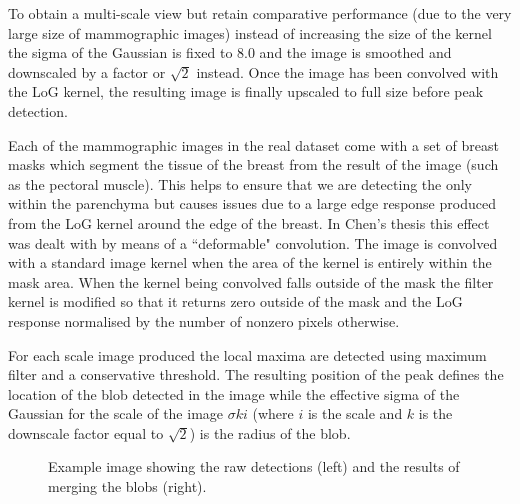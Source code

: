 To obtain a multi-scale view but retain comparative performance (due to the very large size of mammographic images) instead of increasing the size of the kernel the sigma of the Gaussian is fixed to 8.0 and the image is smoothed and downscaled by a factor or $\sqrt{2}$ instead. Once the image has been convolved with the LoG kernel, the resulting image is finally upscaled to full size before peak detection.

Each of the mammographic images in the real dataset come with a set of breast masks which segment the tissue of the breast from the result of the image (such as the pectoral muscle). This helps to ensure that we are detecting the only within the parenchyma but causes issues due to a large edge response produced from the LoG kernel around the edge of the breast. In Chen's thesis this effect was dealt with by means of a ``deformable" convolution. The image is convolved with a standard image kernel when the area of the kernel is entirely within the mask area. When the kernel being convolved falls outside of the mask the filter kernel is modified so that it returns zero outside of the mask and the LoG response normalised by the number of nonzero pixels otherwise.

For each scale image produced the local maxima are detected using maximum filter and a conservative threshold. The resulting position of the peak defines the location of the blob detected in the image while the effective sigma of the Gaussian for the scale of the image $\sigma k i$ (where $i$ is the scale and $k$ is the downscale factor equal to $\sqrt{2}$) is the radius of the blob.


\begin{figure}[H]
	\centering
	\caption{Example image showing the raw detections (left) and the results of merging the blobs (right).}\label{fig:blob-detection}
\end{figure}



